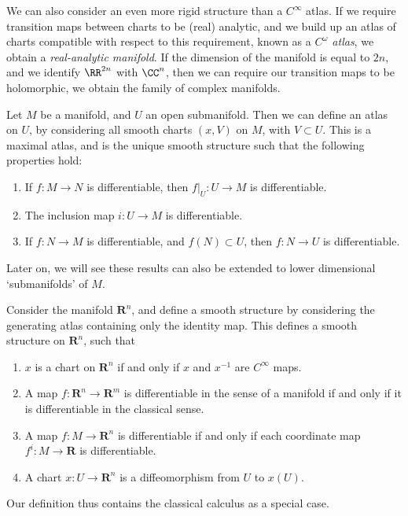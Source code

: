 We can also consider an even more rigid structure than a $C^\infty$ atlas. If we require transition maps between charts to be (real) analytic, and we build up an atlas of charts compatible with respect to this requirement, known as a \emph{$C^\omega$ atlas}, we obtain a \emph{real-analytic manifold}. If the dimension of the manifold is equal to $2n$, and we identify $\RR^{2n}$ with $\CC^n$, then we can require our transition maps to be holomorphic, we obtain the family of complex manifolds.

\begin{example}
    Let $M$ be a manifold, and $U$ an open submanifold. Then we can define an atlas on $U$, by considering all smooth charts $(x,V)$ on $M$, with $V \subset U$. This is a maximal atlas, and is the unique smooth structure such that the following properties hold:
    \begin{enumerate}
        \item If $f: M \to N$ is differentiable, then $f|_U: U \to M$ is differentiable.
        \item The inclusion map $i:U \to M$ is differentiable.
        \item If $f: N \to M$ is differentiable, and $f(N) \subset U$, then $f: N \to U$ is differentiable.
    \end{enumerate}
    Later on, we will see these results can also be extended to lower dimensional `submanifolds' of $M$.
\end{example}

\begin{example}
    Consider the manifold $\mathbf{R}^n$, and define a smooth structure by considering the generating atlas containing only the identity map. This defines a smooth structure on $\mathbf{R}^n$, such that
    \begin{enumerate}
        \item $x$ is a chart on $\mathbf{R}^n$ if and only if $x$ and $x^{-1}$ are $C^\infty$ maps.
        \item A map $f:\mathbf{R}^n \to \mathbf{R}^m$ is differentiable in the sense of a manifold if and only if it is differentiable in the classical sense.
        \item A map $f:M \to \mathbf{R}^n$ is differentiable if and only if each coordinate map $f^i:M \to \mathbf{R}$ is differentiable.
        \item A chart $x:U \to \mathbf{R}^n$ is a diffeomorphism from $U$ to $x(U)$.
    \end{enumerate}
    Our definition thus contains the classical calculus as a special case.
\end{example}

